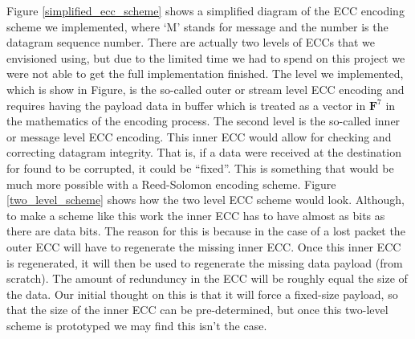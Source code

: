 \documentclass[conference]{IEEEtran}
\theoremstyle{definition}
\begin{document}
Figure \ref{simplified_ecc_scheme}
shows a simplified diagram of the ECC encoding scheme we implemented,
where `M' stands for message and the number is the datagram
sequence number.  There are actually two levels of ECCs
that we envisioned using, but due to the limited time we
had to spend on this project we were not able to get the
full implementation finished.  The level we implemented,
which is show in Figure, is the so-called outer or
stream level ECC encoding and requires having the payload
data in buffer which is treated as a vector in $\mathbf{F}^7$
in the mathematics of the encoding process.  The second level
is the so-called inner or message level ECC encoding.  This
inner ECC would allow for checking and correcting datagram
integrity.  That is, if a data were received at the destination
for found to be corrupted, it could be ``fixed''.  This
is something that would be much more possible with a 
Reed-Solomon encoding scheme.  Figure \ref{two_level_scheme}
shows how the two level ECC scheme would look.  Although,
to make a scheme like this work the inner ECC has to have
almost as bits as there are data bits.  The reason for this
is because in the case of a lost packet the outer ECC will
have to regenerate the missing inner ECC.  Once this inner
ECC is regenerated, it will then be used to regenerate
the missing data payload (from scratch).  The amount
of redunduncy in the ECC will be roughly equal the size of
the data.  Our initial thought on this is that it will
force a fixed-size payload, so that the size of the inner
ECC can be pre-determined, but once this two-level scheme
is prototyped we may find this isn't the case.
\end{document}
